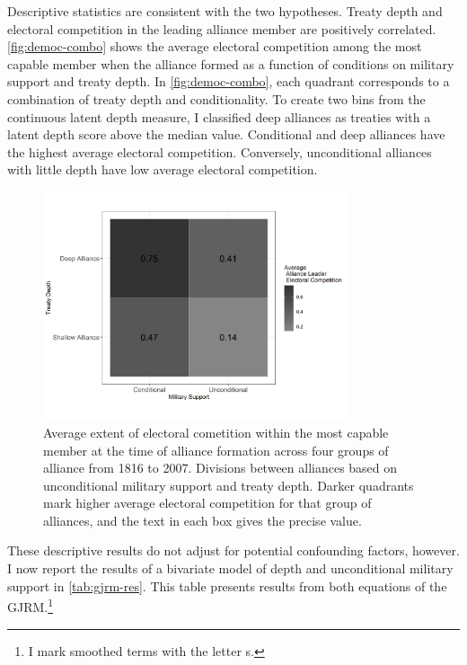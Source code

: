 \documentclass[12pt]{article}
\begin{document}
Descriptive statistics are consistent with the two hypotheses.
Treaty depth and electoral competition in the leading alliance member are positively correlated. 
\autoref{fig:democ-combo} shows the average electoral competition among the most capable member when the alliance formed as a function of conditions on military support and treaty depth.
In \autoref{fig:democ-combo}, each quadrant corresponds to a combination of treaty depth and conditionality. 
To create two bins from the continuous latent depth measure, I classified deep alliances as treaties with a latent depth score above the median value. 
Conditional and deep alliances have the highest average electoral competition. 
Conversely, unconditional alliances with little depth have low average electoral competition.


\begin{figure}[hbtp]
\centering
\includegraphics[width=0.8\textwidth]{../figures/democ-combo.png}
\caption{Average extent of electoral cometition within the most capable member at the time of alliance formation across four groups of alliance from 1816 to 2007. Divisions between alliances based on unconditional military support and treaty depth. Darker quadrants mark higher average electoral competition for that group of alliances, and the text in each box gives the precise value.}
\label{fig:democ-combo}
\end{figure}


These descriptive results do not adjust for potential confounding factors, however.
I now report the results of a bivariate model of depth and unconditional military support in \autoref{tab:gjrm-res}. 
This table presents results from both equations of the GJRM.\footnote{I mark smoothed terms with the letter s.} 
\end{document}

